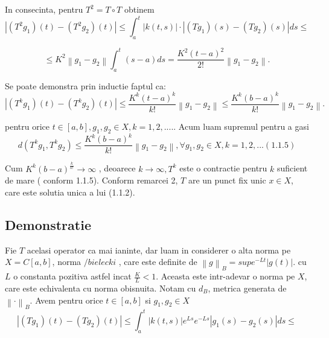 \documentclass[a4paper,12pt,oneside]{report}
\begin{document}
	In consecinta, pentru \(T^{2} = T \circ T\) obtinem 
\begin{displaymath}
  \left | \left ( T^{2}g_{1} \right )\left ( t \right )  - \left ( T^{2}g_{2} \right )\left ( t \right )\right |\leq \int_{a}^{t}\left | k\left ( t,s \right ) \right |\cdot \left | \left ( Tg_{1} \right )\left ( s \right ) - \left ( Tg_{2} \right )\left ( s \right ) \right |ds\leq
\end{displaymath}

\begin{displaymath}
  \leq K^{2}\left \| g_{1} - g_{2} \right \|\int_{a}^{t}\left ( s-a \right )ds = \frac{K^{2}\left ( t-a \right )^{2}}{2!}\left \| g_{1} - g_{2} \right \|. 
\end{displaymath}


	Se poate demonstra prin inductie faptul ca:
\begin{displaymath}
  \left | \left ( T^{k}g_{1} \right ) \left ( t \right ) - \left ( T^{k}g_{2} \right )\left ( t \right )\right |\leq \frac{K^{k}\left ( t-a \right )^{k}}{k!}\left \| g_{1} - g_{2} \right \|\leq \frac{K^{k}\left ( b-a \right )^{k}}{k!}\left \| g_{1}- g_{2} \right \|. 
\end{displaymath}

pentru orice  \(t\in \left [ a,b \right ], g_{1}, g_{2} \in X, k = 1,2,.....\) Acum luam supremul pentru a gasi
\begin{displaymath}
  d\left ( T^{k}g_{1} , T^{k}g_{2}\right ) \leq \frac{K^{k}\left ( b - a  \right )^{k}}{k!}\left \| g_{1} - g_{2}\right \|, \forall g_{1}, g_{2} \in X, k = 1,2,... ( 1.1.5)
\end{displaymath}

	 Cum \(K^{k} \left ( b-a \right )^{\frac{k}{k!}}\rightarrow \infty\) , deoarece \(k\rightarrow \infty, T^{k}\) este o contractie pentru \(k\) suficient de mare ( conform 1.1.5). Conform remarcei 2, \(T\) are un punct fix unic \(x \in X\), care este solutia unica a lui (1.1.2). 

\subsection{Demonstratie}

Fie \(T\) acelasi operator ca mai ianinte, dar luam in considerer o alta norma pe \(X = C\left [ a,b \right ]\), norma \(/bielecki\) , care este definite de \(\left \| g \right \|_{B} = sup e^{-Lt}\left | g\left ( t \right ) \right |\). 
cu \(L\) o constanta pozitiva astfel incat \(\frac{K}{L} < 1\). Aceasta este intr-adevar o norma pe \(X\), care este echivalenta cu norma obisnuita. Notam cu \(d_{B}\), metrica generata de \(\left \| \cdot \right \|_{B}\). Avem pentru orice \(t\in \left [ a,b  \right ]\) si \(g_{1}, g_{2} \in X\) 
\begin{displaymath}
  \left | \left ( Tg_{1} \right )\left ( t \right ) - \left ( Tg_{2} \right )\left ( t \right ) \right | \leq  \int_{a}^{t} \left | k\left ( t,s \right ) \right |e^{Ls}e^{-Ls}\left | g_{1}\left ( s \right ) - g_{2}\left ( s \right ) \right |ds \leq
\end{displaymath}
\end{document}
